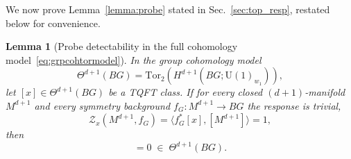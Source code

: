 \documentclass[aps,prx,reprint,superscriptaddress,twocolumn,amsmath,amssymb,amsfonts, nofootinbib]{revtex4-2}
\newcommand{\U}{\text{U}}
\newcommand{\tor}{\text{Tor}}
\theoremstyle{apsstyle}
\newtheorem{lemma}{Lemma}
\begin{document}
\noindent We now prove Lemma~\ref{lemma:probe} stated in Sec.~\ref{sec:top_resp}, restated below for convenience.

\bigskip

\begin{lemma}[Probe detectability in the full cohomology model~\eqref{eq:grpcohtormodel}]
\label{lemma:probe_grpcoh}
In the group cohomology model
\begin{equation*}
\Theta^{d+1}(BG)=\tor_{2}\left(H^{d+1}(BG;\U(1)_{w_{1}})\right),
\end{equation*}
let $[x]\in \Theta^{d+1}(BG)$ be a TQFT class. If for every closed $(d{+}1)$-manifold $M^{d+1}$ and every symmetry background $f_G:M^{d+1}\to BG$
the response is trivial,
\begin{equation*}
\mathcal Z_x(M^{d+1},f_G) = \big\langle f_G^*[x],[M^{d+1}]\big\rangle = 1,
\end{equation*}
then
\begin{equation*} [x]=0 \;\in \;\Theta^{d+1}(BG).
\end{equation*}
\end{lemma}
\end{document}
